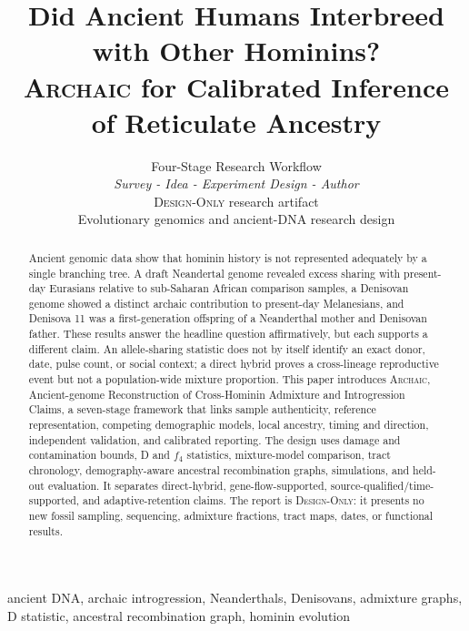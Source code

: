 \documentclass[conference]{IEEEtran}
\newcommand{\archaic}{\textsc{Archaic}}
\newcommand{\designonly}{\textsc{Design-Only}}
\begin{document}
\title{Did Ancient Humans Interbreed with Other Hominins?\\
\archaic{} for Calibrated Inference of Reticulate Ancestry}

\author{Four-Stage Research Workflow\\
\textit{Survey - Idea - Experiment Design - Author}\\
\designonly{} research artifact\\
Evolutionary genomics and ancient-DNA research design}

\maketitle

\begin{abstract}
Ancient genomic data show that hominin history is not represented adequately by a single branching tree. A draft Neandertal genome revealed excess sharing with present-day Eurasians relative to sub-Saharan African comparison samples, a Denisovan genome showed a distinct archaic contribution to present-day Melanesians, and Denisova 11 was a first-generation offspring of a Neanderthal mother and Denisovan father. These results answer the headline question affirmatively, but each supports a different claim. An allele-sharing statistic does not by itself identify an exact donor, date, pulse count, or social context; a direct hybrid proves a cross-lineage reproductive event but not a population-wide mixture proportion. This paper introduces \archaic{}, Ancient-genome Reconstruction of Cross-Hominin Admixture and Introgression Claims, a seven-stage framework that links sample authenticity, reference representation, competing demographic models, local ancestry, timing and direction, independent validation, and calibrated reporting. The design uses damage and contamination bounds, D and $f_4$ statistics, mixture-model comparison, tract chronology, demography-aware ancestral recombination graphs, simulations, and held-out evaluation. It separates direct-hybrid, gene-flow-supported, source-qualified/time-supported, and adaptive-retention claims. The report is \designonly{}: it presents no new fossil sampling, sequencing, admixture fractions, tract maps, dates, or functional results.
\end{abstract}

\begin{IEEEkeywords}
ancient DNA, archaic introgression, Neanderthals, Denisovans, admixture graphs, D statistic, ancestral recombination graph, hominin evolution
\end{IEEEkeywords}
\end{document}

